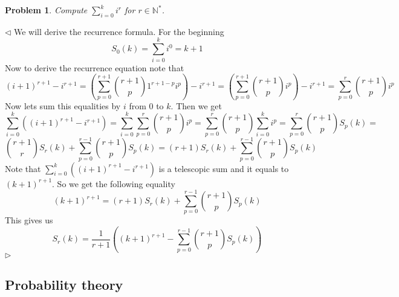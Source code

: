 \documentclass[12pt]{article}
\newtheorem{problem}{Problem}[subsection]
\newenvironment{solution}{\par $\triangleleft$}{$\triangleright$}
\begin{document}
\begin{problem} Compute $\sum_{i=0}^k i^r$ for $r\in\mathbb{N}^*$.
\end{problem}
\begin{solution}
    We will derive the recurrence formula. For the beginning
    $$
        S_0(k)=\sum\limits_{i=0}^k i^0=k+1
    $$
    Now to derive the recurrence equation note that
    $$
        {(i+1)}^{r+1}-i^{r+1}
        =\left(\sum\limits_{p=0}^{r+1}
        \binom{r+1}{p} 1^{r+1-p} i^p\right) -i^{r+1}
        =\left(\sum\limits_{p=0}^{r+1}
        \binom{r+1}{p} i^p\right) -i^{r+1}
        =\sum\limits_{p=0}^{r} \binom{r+1}{p} i^p
    $$
    Now lets sum this equalities by $i$ from $0$ to $k$. Then we get
    $$
        \sum\limits_{i=0}^{k} \left({(i+1)}^{r+1}-i^{r+1}\right)=
        \sum\limits_{i=0}^{k} \sum\limits_{p=0}^{r} \binom{r+1}{p} i^p=
        \sum\limits_{p=0}^{r} \binom{r+1}{p}\sum\limits_{i=0}^{k}  i^p=
        \sum\limits_{p=0}^{r} \binom{r+1}{p}S_p(k)=
    $$
    $$
        \binom{r+1}{r}S_{r}(k)+\sum\limits_{p=0}^{r-1} \binom{r+1}{p}S_p(k)=
        (r+1)S_{r}(k)+\sum\limits_{p=0}^{r-1} \binom{r+1}{p}S_p(k)
    $$
    Note that $\sum\limits_{i=0}^{k} \left({(i+1)}^{r+1}-i^{r+1}\right)$ is a
    telescopic sum and it equals to ${(k+1)}^{r+1}$. So we get the following
    equality
    $$
        {(k+1)}^{r+1}=(r+1)S_{r}(k)+\sum\limits_{p=0}^{r-1} \binom{r+1}{p}S_p(k)
    $$
    This gives us
    $$
        S_r(k)=\frac{1}{r+1}\left({(k+1)}^{r+1}
        -\sum\limits_{p=0}^{r-1} \binom{r+1}{p}S_p(k)\right)
    $$
\end{solution}

















\newpage

\subsection{Probability theory}
\end{document}
